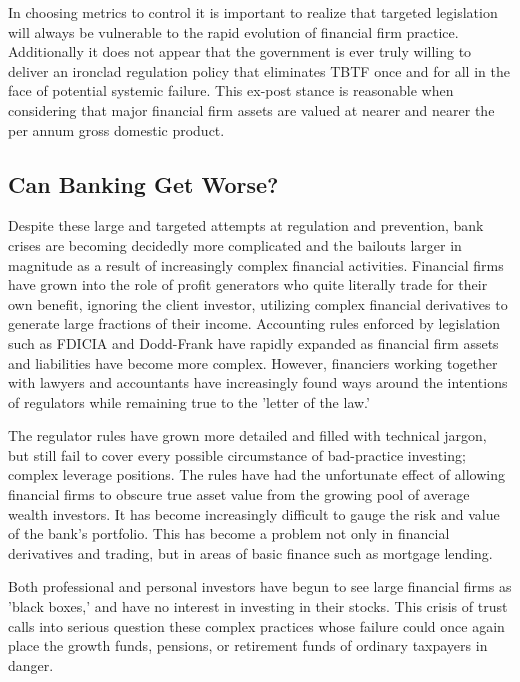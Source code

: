 In choosing metrics to control it is important to realize that targeted legislation will always be vulnerable to the rapid evolution of financial firm practice.  Additionally it does not appear that the government is ever truly willing to deliver an ironclad regulation policy that eliminates TBTF once and for all in the face of potential systemic failure.  This ex-post stance is reasonable when considering that major financial firm assets are valued at nearer and nearer the per annum gross domestic product.

\subsection{Can Banking Get Worse?}

Despite these large and targeted attempts at regulation and prevention, bank crises are becoming decidedly more complicated and the bailouts larger in magnitude as a result of increasingly complex financial activities. Financial firms have grown into the role of profit generators who quite literally trade for their own benefit, ignoring the client investor, utilizing complex financial derivatives to generate large fractions of their income.\cite{Dowd} Accounting rules enforced by legislation such as FDICIA and Dodd-Frank have rapidly expanded as financial firm assets and liabilities have become more complex. However, financiers working together with lawyers and accountants have increasingly found ways around the intentions of regulators while remaining true to the 'letter of the law.'  

The regulator rules have grown more detailed and filled with technical jargon, but still fail to cover every possible circumstance of bad-practice investing; complex leverage positions. The rules have had the unfortunate effect of allowing financial firms to obscure true asset value from the growing pool of average wealth investors. It has become increasingly difficult to gauge the risk and value of the bank's portfolio. This has become a problem not only in financial derivatives and trading, but in areas of basic finance such as mortgage lending. 

Both professional and personal investors have begun to see large financial firms as 'black boxes,' and have no interest in investing in their stocks. This crisis of trust calls into serious question these complex practices whose failure could once again place the growth funds, pensions, or retirement funds of ordinary taxpayers in danger.

